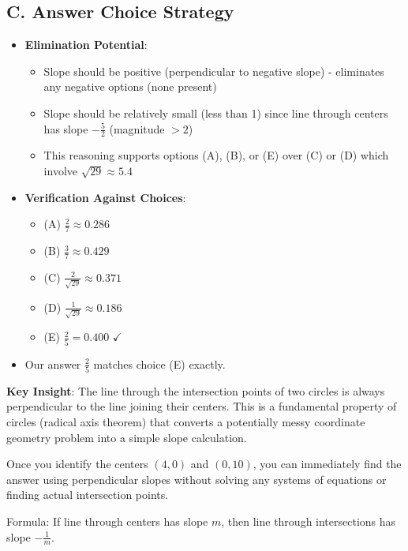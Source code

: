\documentclass[12pt]{article}
\begin{document}
\begin{competitionbox}
\subsection*{C. Answer Choice Strategy}
\begin{itemize}[leftmargin=*]
    \item \textbf{Elimination Potential}:
    \begin{itemize}
        \item Slope should be positive (perpendicular to negative slope) - eliminates any negative options (none present)
        \item Slope should be relatively small (less than 1) since line through centers has slope $-\frac{5}{2}$ (magnitude $> 2$)
        \item This reasoning supports options (A), (B), or (E) over (C) or (D) which involve $\sqrt{29} \approx 5.4$
    \end{itemize}
    \item \textbf{Verification Against Choices}:
    \begin{itemize}
        \item (A) $\frac{2}{7} \approx 0.286$ 
        \item (B) $\frac{3}{7} \approx 0.429$
        \item (C) $\frac{2}{\sqrt{29}} \approx 0.371$
        \item (D) $\frac{1}{\sqrt{29}} \approx 0.186$
        \item (E) $\frac{2}{5} = 0.400$ $\checkmark$
    \end{itemize}
    \item Our answer $\frac{2}{5}$ matches choice (E) exactly.
\end{itemize}
\end{competitionbox}

\begin{keyinsightbox}
\textbf{Key Insight}: The line through the intersection points of two circles is always perpendicular to the line joining their centers. This is a fundamental property of circles (radical axis theorem) that converts a potentially messy coordinate geometry problem into a simple slope calculation.

Once you identify the centers $(4,0)$ and $(0,10)$, you can immediately find the answer using perpendicular slopes without solving any systems of equations or finding actual intersection points.

Formula: If line through centers has slope $m$, then line through intersections has slope $-\frac{1}{m}$.
\end{keyinsightbox}
\end{document}
